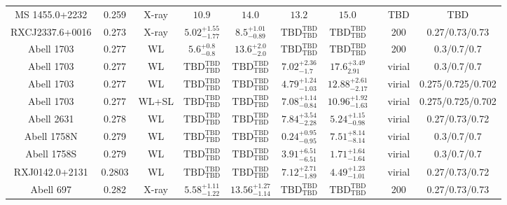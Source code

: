 \begin{table}
\begin{tabular}{cccccccccc}
MS 1455.0+2232 & 0.259 & X-ray & ${10.9}^{}_{}$ & ${14.0}^{}_{}$ & ${13.2}^{}_{}$ & ${15.0}^{}_{}$ & \citet{MO99.1} & TBD & TBD \\
RXCJ2337.6+0016 & 0.273 & X-ray & ${5.02}^{+1.55}_{-1.77}$ & ${8.5}^{+1.01}_{-0.89}$ & ${\mathrm{TBD}}^{\mathrm{TBD}}_{\mathrm{TBD}}$ & ${\mathrm{TBD}}^{\mathrm{TBD}}_{\mathrm{TBD}}$ & \citet{BA14.1} & 200 & 0.27/0.73/0.73 \\
Abell 1703 & 0.277 & WL & ${5.6}^{+0.8}_{-0.8}$ & ${13.6}^{+2.0}_{-2.0}$ & ${\mathrm{TBD}}^{\mathrm{TBD}}_{\mathrm{TBD}}$ & ${\mathrm{TBD}}^{\mathrm{TBD}}_{\mathrm{TBD}}$ & \citet{SE14.1} & 200 & 0.3/0.7/0.7 \\
Abell 1703 & 0.277 & WL & ${\mathrm{TBD}}^{\mathrm{TBD}}_{\mathrm{TBD}}$ & ${\mathrm{TBD}}^{\mathrm{TBD}}_{\mathrm{TBD}}$ & ${7.02}^{+2.36}_{-1.7}$ & ${17.6}^{+3.49}_{2.91}$ & \citet{UM11.1} & virial & 0.3/0.7/0.7 \\
Abell 1703 & 0.277 & WL & ${\mathrm{TBD}}^{\mathrm{TBD}}_{\mathrm{TBD}}$ & ${\mathrm{TBD}}^{\mathrm{TBD}}_{\mathrm{TBD}}$ & ${4.79}^{+1.24}_{-1.03}$ & ${12.88}^{+2.61}_{-2.17}$ & \citet{OG12.1} & virial & 0.275/0.725/0.702 \\
Abell 1703 & 0.277 & WL+SL & ${\mathrm{TBD}}^{\mathrm{TBD}}_{\mathrm{TBD}}$ & ${\mathrm{TBD}}^{\mathrm{TBD}}_{\mathrm{TBD}}$ & ${7.08}^{+1.14}_{-0.84}$ & ${10.96}^{+1.92}_{-1.63}$ & \citet{OG12.1} & virial & 0.275/0.725/0.702 \\
Abell 2631 & 0.278 & WL & ${\mathrm{TBD}}^{\mathrm{TBD}}_{\mathrm{TBD}}$ & ${\mathrm{TBD}}^{\mathrm{TBD}}_{\mathrm{TBD}}$ & ${7.84}^{+3.54}_{-2.28}$ & ${5.24}^{+1.15}_{-0.98}$ & \citet{OK10.1} & virial & 0.27/0.73/0.72 \\
Abell 1758N & 0.279 & WL & ${\mathrm{TBD}}^{\mathrm{TBD}}_{\mathrm{TBD}}$ & ${\mathrm{TBD}}^{\mathrm{TBD}}_{\mathrm{TBD}}$ & ${0.24}^{+0.95}_{-0.95}$ & ${7.51}^{+8.14}_{-8.14}$ & \citet{OK08.1} & virial & 0.3/0.7/0.7 \\
Abell 1758S & 0.279 & WL & ${\mathrm{TBD}}^{\mathrm{TBD}}_{\mathrm{TBD}}$ & ${\mathrm{TBD}}^{\mathrm{TBD}}_{\mathrm{TBD}}$ & ${3.91}^{+6.51}_{-6.51}$ & ${1.71}^{+1.64}_{-1.64}$ & \citet{OK08.1} & virial & 0.3/0.7/0.7 \\
RXJ0142.0+2131 & 0.2803 & WL & ${\mathrm{TBD}}^{\mathrm{TBD}}_{\mathrm{TBD}}$ & ${\mathrm{TBD}}^{\mathrm{TBD}}_{\mathrm{TBD}}$ & ${7.12}^{+2.71}_{-1.89}$ & ${4.49}^{+1.23}_{-1.01}$ & \citet{OK10.1} & virial & 0.27/0.73/0.72 \\
Abell 697 & 0.282 & X-ray & ${5.58}^{+1.11}_{-1.22}$ & ${13.56}^{+1.27}_{-1.14}$ & ${\mathrm{TBD}}^{\mathrm{TBD}}_{\mathrm{TBD}}$ & ${\mathrm{TBD}}^{\mathrm{TBD}}_{\mathrm{TBD}}$ & \citet{BA14.1} & 200 & 0.27/0.73/0.73 \\

\end{tabular}
\end{table}
